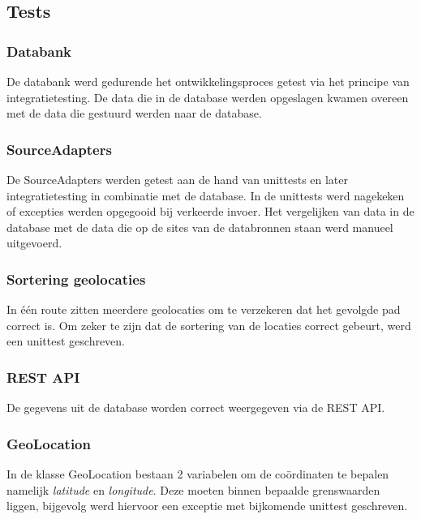 \documentclass[ps,a4paper,oneside]{report}
\begin{document}
\subsection{Tests}
\subsubsection{Databank}
De databank werd gedurende het ontwikkelingsproces getest via het principe van integratietesting. De data die in de database werden opgeslagen kwamen overeen met de data die gestuurd werden naar de database.
\subsubsection{SourceAdapters}
De SourceAdapters werden getest aan de hand van unittests en later integratietesting in combinatie met de database. In de unittests werd nagekeken of excepties werden opgegooid bij verkeerde invoer. Het vergelijken van data in de database met de data die op de sites van de databronnen staan werd manueel uitgevoerd.
\subsubsection{Sortering geolocaties}
In \'e\'en route zitten meerdere geolocaties om te verzekeren dat het gevolgde pad correct is. Om zeker te zijn dat de sortering van de locaties correct gebeurt, werd een unittest geschreven.
\subsubsection{REST API}
De gegevens uit de database worden correct weergegeven via de REST API.
\subsubsection{GeoLocation}
In de klasse GeoLocation bestaan 2 variabelen om de co\"ordinaten te bepalen namelijk \textit{latitude} en \textit{longitude}. Deze moeten binnen bepaalde grenswaarden liggen, bijgevolg werd hiervoor een exceptie met bijkomende unittest geschreven.
\end{document}
